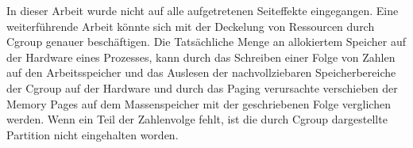In dieser Arbeit wurde nicht auf alle aufgetretenen Seiteffekte eingegangen. Eine weiterführende Arbeit könnte sich mit der Deckelung von Ressourcen durch Cgroup genauer beschäftigen. Die Tatsächliche Menge an allokiertem Speicher auf der Hardware eines Prozesses, kann durch das Schreiben einer Folge von Zahlen auf den Arbeitsspeicher und das Auslesen der nachvollziebaren Speicherbereiche der Cgroup auf der Hardware und durch das Paging verursachte verschieben der Memory Pages auf dem Massenspeicher mit der geschriebenen Folge verglichen werden. Wenn ein Teil der Zahlenvolge fehlt, ist die durch Cgroup dargestellte Partition nicht eingehalten worden. 

\pagebreak